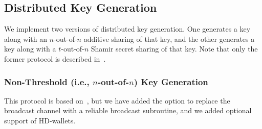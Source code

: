 \documentclass[11pt]{article}
\newcommand{\?}[1]{\stackrel{?}{#1}}
\begin{document}
\subsection{Distributed Key Generation}
We implement two versions of distributed key generation. One generates a key along with an $n$-out-of-$n$ additive sharing of that key, and the other generates a key along with a $t$-out-of-$n$ Shamir secret sharing of that key. Note that only the former protocol is described in~\cite{cggmp21}.

\subsubsection{Non-Threshold (i.e., $n$-out-of-$n$) Key Generation}
\label{sec:n-of-n-dkg}

This protocol is based on~\cite[Figure~5]{cggmp21}, but we have added the option to replace the broadcast channel with a reliable broadcast subroutine, and we added optional support of HD-wallets.
\end{document}
